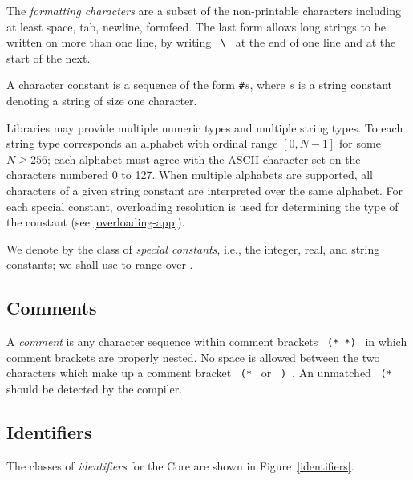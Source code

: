 The {\sl formatting characters} are a subset of the non-printable
            characters including at least space, tab, newline, formfeed.
The last form allows long strings to be written on more than one line, by
            writing ~\verb+\+~ at the end of one line and at the start of the
            next.\nopagebreak

A character constant is a sequence of the form \verb+#+$s$, where $s$
is a string constant denoting a string of size one character.

Libraries may provide multiple numeric types and multiple string types. To each string type corresponds an alphabet with ordinal range $[0, N -  1]$ for some 
$N\geq 256$; each alphabet must agree with the ASCII character set on the characters numbered 0 to 127. When multiple alphabets are supported, all characters of a given string constant are interpreted over the same alphabet. For each special constant, overloading resolution is used for determining the type of the constant (see \ref{overloading-app}).

We denote by {\SCon} the class of {\sl special constants}, i.e., the integer,
real, and string constants; we shall use {\scon}
to range over \SCon.

\subsection{Comments}
A {\sl comment} 
is any character sequence within comment brackets ~{\tt (* *)}~
in which
comment brackets are properly nested. No space is allowed between the two characters which make up a comment bracket  ~{\tt(*}~ or  ~{\tt*)}~.
An unmatched ~{\tt (*}~ should be
detected by the compiler.

%
\subsection{Identifiers}
\label{cyn-core-identifiers-sec}
The classes of {\sl identifiers} for the Core are shown in
Figure~\ref{identifiers}.

